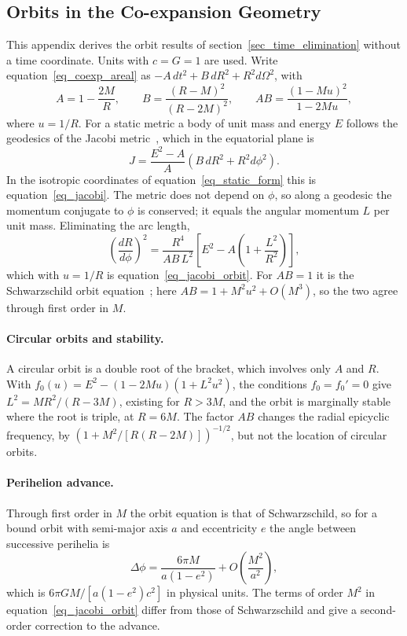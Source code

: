 \documentclass{iopjournal}
\begin{document}
\begin{appendices}

\section{Orbits in the Co-expansion Geometry}\label{app_orbits}

This appendix derives the orbit results of section~\ref{sec_time_elimination} without a time coordinate. Units with $c=G=1$ are used. Write equation~\eqref{eq_coexp_areal} as $-A\,dt^2+B\,dR^2+R^2d\Omega^2$, with
\begin{equation}
    A=1-\frac{2M}{R},
    \qquad
    B=\frac{(R-M)^2}{(R-2M)^2},
    \qquad
    AB=\frac{(1-Mu)^2}{1-2Mu},
\end{equation}
where $u=1/R$. For a static metric a body of unit mass and energy $E$ follows the geodesics of the Jacobi metric~\cite{Gibbons2016Jacobi}, which in the equatorial plane is
\begin{equation}
    J=\frac{E^2-A}{A}\left(B\,dR^2+R^2d\phi^2\right).
\end{equation}
In the isotropic coordinates of equation~\eqref{eq_static_form} this is equation~\eqref{eq_jacobi}. The metric does not depend on $\phi$, so along a geodesic the momentum conjugate to $\phi$ is conserved; it equals the angular momentum $L$ per unit mass. Eliminating the arc length,
\begin{equation}
    \left(\frac{dR}{d\phi}\right)^2=\frac{R^4}{AB\,L^2}\left[E^2-A\left(1+\frac{L^2}{R^2}\right)\right],
\end{equation}
which with $u=1/R$ is equation~\eqref{eq_jacobi_orbit}. For $AB=1$ it is the Schwarzschild orbit equation~\cite{MTW1973}; here $AB=1+M^2u^2+O(M^3)$, so the two agree through first order in $M$.

\paragraph{Circular orbits and stability.} A circular orbit is a double root of the bracket, which involves only $A$ and $R$. With $f_0(u)=E^2-(1-2Mu)(1+L^2u^2)$, the conditions $f_0=f_0'=0$ give $L^2=MR^2/(R-3M)$, existing for $R>3M$, and the orbit is marginally stable where the root is triple, at $R=6M$. The factor $AB$ changes the radial epicyclic frequency, by $\left(1+M^2/[R(R-2M)]\right)^{-1/2}$, but not the location of circular orbits.

\paragraph{Perihelion advance.} Through first order in $M$ the orbit equation is that of Schwarzschild, so for a bound orbit with semi-major axis $a$ and eccentricity $e$ the angle between successive perihelia is
\begin{equation}
    \Delta\phi=\frac{6\pi M}{a(1-e^2)}+O\!\left(\frac{M^2}{a^2}\right),
\end{equation}
which is $6\pi GM/[a(1-e^2)c^2]$ in physical units. The terms of order $M^2$ in equation~\eqref{eq_jacobi_orbit} differ from those of Schwarzschild and give a second-order correction to the advance.


\end{appendices}
\end{document}

